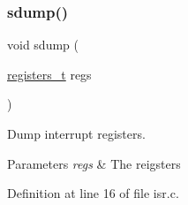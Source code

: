 \mbox{\label{a00116_a4b4233daef6e041e7278cae2b21b5ed4_a4b4233daef6e041e7278cae2b21b5ed4}} 
\subsubsection{\texorpdfstring{sdump()}{sdump()}}
{\footnotesize\ttfamily void sdump (\begin{DoxyParamCaption}\item[{\hyperlink{a00140_adf58dbaf6139b4957c348711f2026957_adf58dbaf6139b4957c348711f2026957}{registers\+\_\+t}}]{regs }\end{DoxyParamCaption})}



Dump interrupt registers. 


\begin{DoxyParams}{Parameters}
{\em regs} & The reigsters \\
\hline
\end{DoxyParams}


Definition at line 16 of file isr.\+c.


